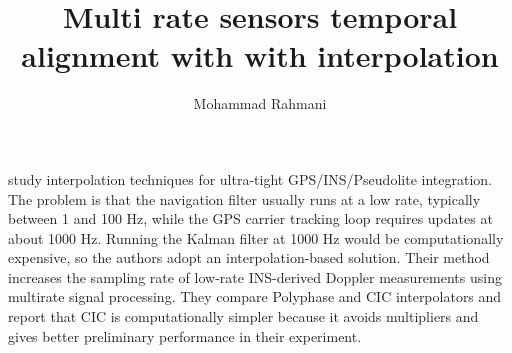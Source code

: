 \documentclass[a4paper]{article}
\title{Multi rate sensors temporal alignment with with interpolation}
\date{}
\author{Mohammad Rahmani}
\begin{document}
    \maketitle
    \cite{babu-2005-comparative-study-of-interpolation-techniques-for-ultra-tight-integration-of-gps-ins-pl-sensors} study interpolation techniques for ultra-tight GPS/INS/Pseudolite integration. The problem is that the navigation filter usually runs at a low rate, typically between 1 and 100 Hz, while the GPS carrier tracking loop requires updates at about 1000 Hz. Running the Kalman filter at 1000 Hz would be computationally expensive, so the authors adopt an interpolation-based solution. Their method increases the sampling rate of low-rate INS-derived Doppler measurements using multirate signal processing. They compare Polyphase and CIC interpolators and report that CIC is computationally simpler because it avoids multipliers and gives better preliminary performance in their experiment.
    
    
\end{document}

